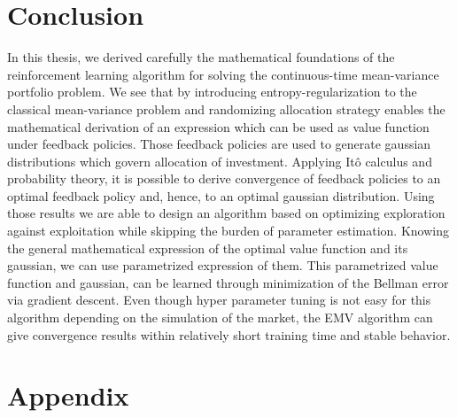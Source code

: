 \documentclass[oneside, a4paper, onecolumn, 11pt]{article}
\begin{document}
\section{Conclusion}
In this thesis, we derived carefully the mathematical foundations of the reinforcement learning algorithm for solving the  continuous-time mean-variance portfolio problem. We see that by introducing entropy-regularization to the classical mean-variance problem and randomizing allocation strategy enables the mathematical derivation of an expression which can be used as value function under feedback policies. Those feedback policies are used to generate gaussian distributions which govern allocation of investment. Applying Itô calculus and probability theory, it is possible to derive convergence of feedback policies to an optimal feedback policy and, hence, to an optimal gaussian distribution. Using those results we are able to design an algorithm based on optimizing exploration against exploitation while skipping the burden of parameter estimation. Knowing the general mathematical expression of the optimal value function and its gaussian, we can use parametrized expression of them. This parametrized value function and gaussian, can be learned through minimization of the Bellman error via gradient descent. Even though hyper parameter tuning is not easy for this algorithm depending on the simulation of the market, the EMV algorithm can give  convergence results within relatively short training time and stable behavior. 
\newpage



\newpage
\appendix

\section{Appendix}
\lstset{style=mystyle}
\end{document}
